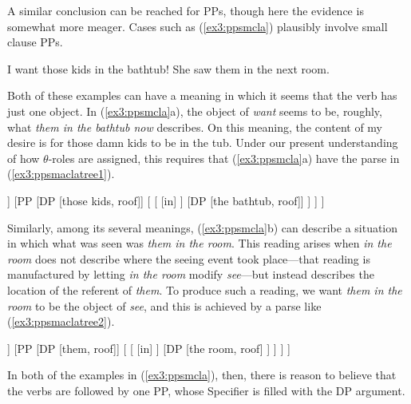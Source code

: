 A similar conclusion can be reached for PPs, though here the evidence is somewhat more meager. Cases such as (\ref{ex3:ppsmcla}) plausibly involve small clause PPs.
\begin{exe}
\ex \label{ex3:ppsmcla} 
\begin{xlist}
	\ex I want those kids in the bathtub!
	\ex She saw them in the next room.
\end{xlist}
\end{exe}
Both of these examples can have a meaning in which it seems that the verb has just one object. In (\ref{ex3:ppsmcla}a), the object of \emph{want} seems to be, roughly, what \emph{them in the bathtub now} describes. On this meaning, the content of my desire is for those damn kids to be in the tub. Under our present understanding of how \mbox{$\theta$-roles} are assigned, this requires that (\ref{ex3:ppsmcla}a) have the parse in (\ref{ex3:ppsmaclatree1}).
\begin{exe}
\ex \label{ex3:ppsmaclatree1} 
\small
\begin{forest}
[\ibar{V}
	[\obar{V} [want] ]
	[PP
		[DP [those kids, roof]]
		[
			[ [in] ]
			[DP [the bathtub, roof]]
		 ]
	 ]
]
\end{forest}
\end{exe}

Similarly, among its several meanings, (\ref{ex3:ppsmcla}b) can describe a situation in which what was seen was \emph{them in the room}. This reading arises when \emph{in the room} does not describe where the seeing event took place---that reading is manufactured by letting \emph{in the room} modify \emph{see}---but instead describes the location of the referent of \emph{them}. To produce such a reading, we want \emph{them in the room} to be the object of \emph{see}, and this is achieved by a parse like (\ref{ex3:ppsmaclatree2}).
\begin{exe}
\ex \label{ex3:ppsmaclatree2} 
\small
\begin{forest}
[\ibar{V}
	[\obar{V} [see] ]
	[PP
		[DP [them, roof]]
		[
			[ [in] ]
			[DP [the room, roof] ]
		 ]
	 ]
]
\end{forest}
\end{exe}
In both of the examples in (\ref{ex3:ppsmcla}), then, there is reason to believe that the verbs are followed by one PP, whose Specifier is filled with the DP argument.

